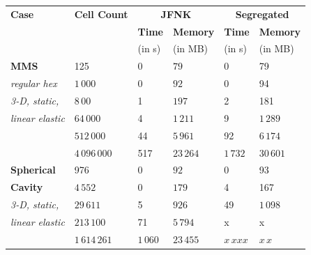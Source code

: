 \documentclass[sn-mathphys,Numbered]{sn-jnl}%
\begin{document}
\begin{table}[!htbp]
	\centering
		\begin{tabular}{ll|ll|ll}
			\hline
			\textbf{Case} & \textbf{Cell Count} & \multicolumn{2}{c|}{\textbf{JFNK}} & \multicolumn{2}{c}{\textbf{Segregated}} \\
			     &            & \textbf{Time} & \textbf{Memory} & \textbf{Time} & \textbf{Memory} \\
			     &            & (in s) & (in MB) & (in s) & (in MB) \\
			\hline 
			\textbf{MMS}			& 125 		& 0 & $79$ 				& 0 & 79 \\
			\emph{regular hex}		& $1\,000$ 	& 0 & $92$ 			& 0 & 94 \\
			\emph{3-D, static,} 		& $8\,00$ 		& 1 & $197$  		& 2 & 181 \\
			\emph{linear elastic}		&  $64\,000$ 	& 4 & $1\,211$ 		& 9 & $1\,289$ \\
								& $512\,000$ 	& 44 & $5\,961$ 	& 92 & $6\,174$ \\
								& $4\,096\,000$ & 517 & $23\,264$ & $1\,732$ & $30\,601$ \\
			\hline
			\textbf{Spherical}	& 976			& 0 & $92$			& 0 & 93 \\
			\textbf{Cavity}		&  $4\,552$		& 0 & $179$			& 4 & 167 \\
			\emph{3-D, static,} 	&  $29\,611$		& 5 & $926$			& 49 & $1\,098$ \\
			\emph{linear elastic} 	& $213\,100$		& 71 & $5\,794$		& x & x \\
							& $1\,614\,261$ 	& $1\,060$ & $23\,455$ 	& $x\,xxx$ & $x\,x$ \\
			\hline

\end{tabular}
\end{table}
\end{document}
